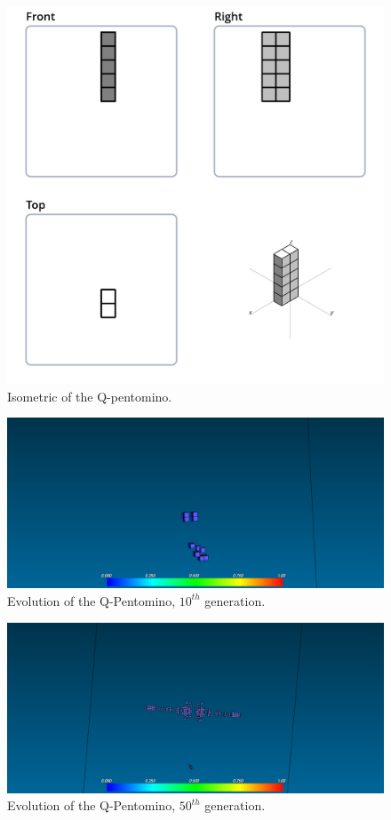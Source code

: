 \begin{figure}
	\centering
	\includegraphics[scale=0.3]{iso_diagrams/o.png}
	\caption{Isometric of the Q-pentomino.}
  \label{fig:iso-pent-q}
\end{figure}

\begin{figure}
	\centering
	\includegraphics[scale=0.3]{pentominoes_ss/q_10.png}
	\caption{Evolution of the Q-Pentomino, $10^{th}$ generation.}
  \label{fig:ss-pent:q-10}
\end{figure}

\begin{figure}
	\centering
	\includegraphics[scale=0.3]{pentominoes_ss/q_50.png}
	\caption{Evolution of the Q-Pentomino, $50^{th}$ generation.}
  \label{fig:ss-pent:q-50}
\end{figure}

